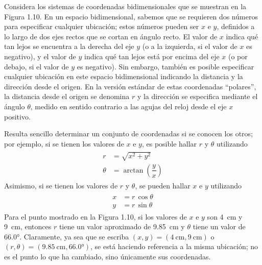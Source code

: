\documentclass[hidelinks,12pt]{article}
\begin{document}
Considera los sistemas de coordenadas bidimensionales que se muestran en la Figura 1.10. En un espacio bidimensional, sabemos que se requieren dos números para especificar cualquier ubicación; estos números pueden ser $x$ e $y$, definidos a lo largo de dos ejes rectos que se cortan en ángulo recto. El valor de $x$ indica qué tan lejos se encuentra a la derecha del eje $y$ (o a la izquierda, si el valor de $x$ es negativo), y el valor de $y$ indica qué tan lejos está por encima del eje $x$ (o por debajo, si el valor de $y$ es negativo). Sin embargo, también es posible especificar cualquier ubicación en este espacio bidimensional indicando la distancia y la dirección desde el origen. En la versión estándar de estas coordenadas \enquote{polares}, la distancia desde el origen se denomina $r$ y la dirección se especifica mediante el ángulo $\theta$, medido en sentido contrario a las agujas del reloj desde el eje $x$ positivo.
\par
Resulta sencillo determinar un conjunto de coordenadas si se conocen los otros; por ejemplo, si se tienen los valores de $x$ e $y$, es posible hallar $r$ y $\theta$ utilizando
\begin{align}
\begin{aligned}
    r &= \sqrt{x^{2} + y^{2}} \\[0.5em]
    \theta &= \arctan \left( \dfrac{y}{x} \right)
\end{aligned}
\label{eq:ecuacion_01_09}
\end{align}
Asimismo, si se tienen los valores de $r$ y $\theta$, se pueden hallar $x$ e $y$ utilizando
\begin{align}
\begin{aligned}
    x &= r \, \cos \theta \\
    y &= r \, \sin \theta
\end{aligned}
\label{eq:ecuacion_01_10}
\end{align}
Para el punto mostrado en la Figura 1.10, si los valores de $x$ e $y$ son \SI{4}{\centi\meter} y \SI{9}{\centi\meter}, entonces $r$ tiene un valor aproximado de \SI{9.85}{\centi\meter} y $\theta$ tiene un valor de $\ang{66.0}$. Claramente, ya sea que se escriba $(x, y) = (\SI{4}{\centi\meter}, \SI{9}{\centi\meter})$ o $(r, \theta) = (\SI{9.85}{\centi\meter}, \ang{66.0})$, se está haciendo referencia a la misma ubicación; no es el punto lo que ha cambiado, sino únicamente sus coordenadas.
\par
\end{document}

